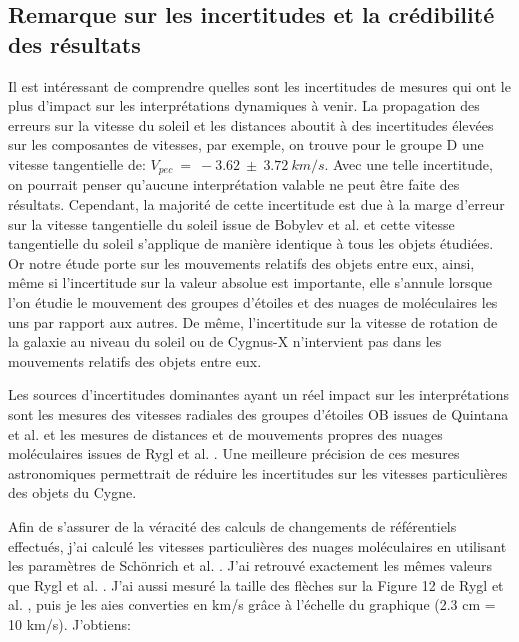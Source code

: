 \documentclass[a4paper, 11pt]{article}
\begin{document}
	\subsection{Remarque sur les incertitudes et la crédibilité des résultats}
	Il est intéressant de comprendre quelles sont les incertitudes de mesures qui ont le plus d'impact sur les interprétations dynamiques à venir. La propagation des erreurs sur la vitesse du soleil et les distances aboutit à des incertitudes élevées sur les composantes de vitesses, par exemple, on trouve pour le groupe D une vitesse tangentielle de: $V_{pec} \ = \ -3.62 \ \pm \ 3.72 \ km/s$. Avec une telle incertitude, on pourrait penser qu’aucune interprétation valable ne peut être faite des résultats. Cependant, la majorité de cette incertitude est due à la marge d'erreur sur la vitesse tangentielle du soleil issue de Bobylev et al. \cite{bobylev2026} et cette vitesse tangentielle du soleil s'applique de manière identique à tous les objets étudiées. Or notre étude porte sur les mouvements relatifs des objets entre eux, ainsi, même si l’incertitude sur la valeur absolue est importante, elle s’annule lorsque l’on étudie le mouvement des groupes d’étoiles et des nuages de moléculaires les uns par rapport aux autres. De même, l’incertitude sur la vitesse de rotation de la galaxie au niveau du soleil ou de Cygnus-X n’intervient pas dans les mouvements relatifs des objets entre eux.
	
	Les sources d'incertitudes dominantes ayant un réel impact sur les interprétations sont les mesures des vitesses radiales des groupes d'étoiles OB issues de Quintana et al. \cite{quintana2022} et les mesures de distances et de mouvements propres des nuages moléculaires issues de Rygl et al. \cite{rygl2012}. Une meilleure précision de ces mesures astronomiques permettrait de réduire les incertitudes sur les vitesses particulières des objets du Cygne.
	
	Afin de s'assurer de la véracité des calculs de changements de référentiels effectués, j'ai calculé les vitesses particulières des nuages moléculaires en utilisant les paramètres de Schönrich et al. \cite{schonrich2010}. J'ai retrouvé exactement les mêmes valeurs que Rygl et al. \cite{rygl2012}. J'ai aussi mesuré la taille des flèches sur la Figure 12 de Rygl et al. \cite{rygl2012}, puis je les aies converties en km/s grâce à l'échelle du graphique (2.3 cm = 10 km/s). J'obtiens:
	
\end{document}
